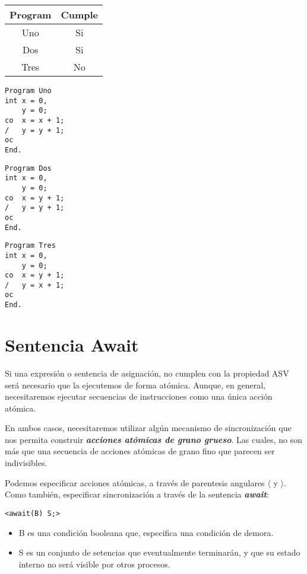 \documentclass[a4paper, 10pt]{report}
\begin{document}
\begin{multicols}{4}
{\renewcommand{\arraystretch}{1.7}%
\centering
\begin{tabular}{cc}
	\textbf{Program} & \textbf{Cumple}\\
	\hline 
	Uno & Si\\ 
	Dos & Si\\ 
	Tres & No\\
\end{tabular}}
\columnbreak
\begin{lstlisting}
Program Uno
int x = 0,
	y = 0;
co  x = x + 1;
/   y = y + 1;
oc
End.
\end{lstlisting}
\columnbreak
\begin{lstlisting}
Program Dos
int x = 0,
	y = 0;
co  x = y + 1;
/   y = y + 1;
oc
End.
\end{lstlisting}
\columnbreak
\begin{lstlisting}
Program Tres
int x = 0,
	y = 0;
co  x = y + 1;
/   y = x + 1;
oc
End.
\end{lstlisting}
\end{multicols}

\section{Sentencia Await}

Si una expresión o sentencia de asignación, no cumplen con la propiedad ASV será necesario que la ejecutemos de forma atómica. Aunque, en general, necesitaremos ejecutar secuencias de instrucciones como una única acción atómica.

En ambos casos, necesitaremos utilizar algún mecanismo de sincronización que nos permita construir \textbf{\emph{acciones atómicas de grano grueso}}. Las cuales, no son más que una secuencia de acciones atómicas de grano fino que parecen ser indivisibles.

Podemos especificar acciones atómicas, a través de parentesis angulares \textbf{\emph{$\langle$}} y \textbf{\emph{$\rangle$}}. Como también, especificar sincronización a través de la sentencia \textbf{\emph{await}}:

\begin{lstlisting}
<await(B) S;>
\end{lstlisting}

\begin{itemize}
	\item B es una condición booleana que, especifica una condición de demora.
	\item S es un conjunto de setencias que eventualmente terminarán, y que su estado interno no será visible por otros procesos.
\end{itemize}
\end{document}
